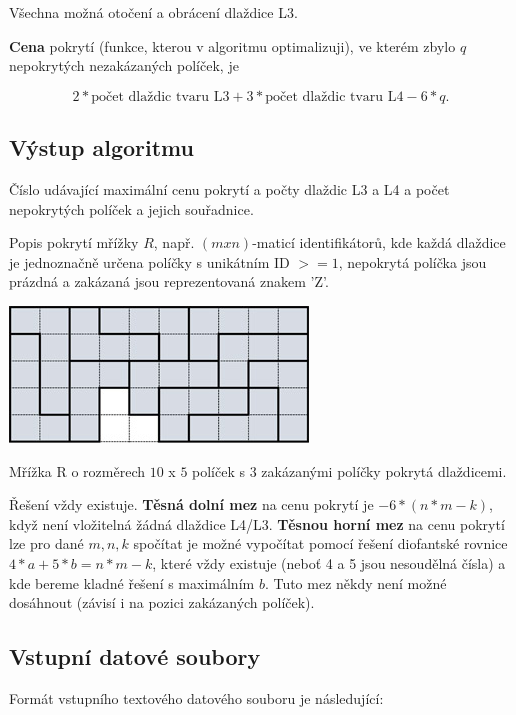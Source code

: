 \documentclass[epsf,epic,eepic,eepicemu]{article}
\begin{document}
 \noindent 
Všechna možná otočení a obrácení dlaždice L3.

\noindent
\textbf{Cena} pokrytí (funkce, kterou v algoritmu optimalizuji), ve kterém zbylo $q$ nepokrytých nezakázaných políček, je

$$ 2 * \text{počet dlaždic tvaru L3} + 3 * \text{počet dlaždic tvaru L4} - 6*q. $$

\subsection{Výstup algoritmu}

Číslo udávající maximální cenu pokrytí a počty dlaždic L3 a L4 a počet nepokrytých políček a jejich souřadnice.

\noindent
Popis pokrytí mřížky $R$, např. $(m x n)$-maticí identifikátorů, kde každá dlaždice je jednoznačně určena políčky 
s unikátním ID $>=1$, nepokrytá políčka jsou prázdná a zakázaná jsou reprezentovaná znakem 'Z'. 

\begin{center}
    \includegraphics{l-example.jpg}
     \label{obr2}
    \end{center}
    
    \noindent
Mřížka R o rozměrech $10$ x $5$ políček s $3$ zakázanými políčky pokrytá dlaždicemi.

\noindent
Řešení vždy existuje.
\textbf{Těsná dolní mez} na cenu pokrytí je $-6*(n*m-k)$, když není vložitelná žádná dlaždice L4/L3.
\textbf{Těsnou horní mez} na cenu pokrytí lze pro dané $m,n,k$ spočítat je možné vypočítat pomocí řešení diofantské rovnice
$4*a+5*b=n*m-k$, které vždy existuje (neboť 4 a 5 jsou nesoudělná čísla) a kde bereme kladné řešení s maximálním $b$. Tuto mez někdy není možné dosáhnout (závisí i na pozici zakázaných políček).


\subsection{Vstupní datové soubory}


Formát vstupního textového datového souboru je následující:
\end{document}
